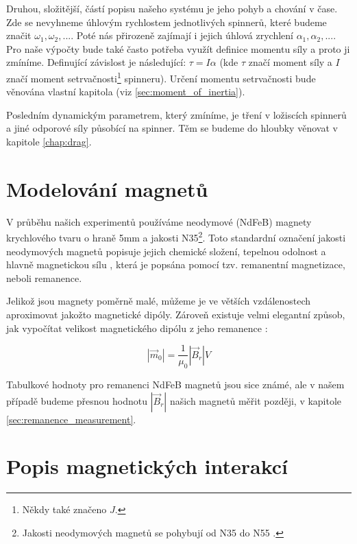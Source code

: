 Druhou, složitější, částí popisu našeho systému je jeho pohyb a chování v čase.
Zde se nevyhneme úhlovým rychlostem jednotlivých spinnerů, které budeme značit $\omega_1, \omega_2,...$.
Poté nás přirozeně zajímají i jejich úhlová zrychlení $\alpha_1, \alpha_2, ...$. Pro naše výpočty bude také často potřeba využít definice momentu síly a proto ji zmíníme. Definující závislost je následující: $\tau = I\alpha$ (kde $\tau$ značí moment síly a $I$ značí moment setrvačnosti\footnote{Někdy také značeno $J$.} spinneru).
Určení momentu setrvačnosti bude věnována vlastní kapitola (viz \autoref{sec:moment_of_inertia}).

Posledním dynamickým parametrem, který zmíníme, je tření v ložiscích spinnerů a jiné odporové síly působící na spinner.
Těm se budeme do hloubky věnovat v kapitole \ref{chap:drag}.

\clearpage

\section{Modelování magnetů}
V průběhu našich experimentů používáme neodymové (NdFeB) magnety krychlového tvaru o hraně 5mm a jakosti N35\footnote{Jakosti neodymových magnetů se pohybují od N35 do N55 \cite{magnet_grades}.}.
Toto standardní označení jakosti neodymových magnetů popisuje jejich chemické složení, tepelnou odolnost a hlavně magnetickou sílu \cite{magnet_grades}, která je popsána pomocí tzv. remanentní magnetizace, neboli remanence.

Jelikož jsou magnety poměrně malé, můžeme je ve větších vzdálenostech aproximovat jakožto magnetické dipóly.
Zároveň existuje velmi elegantní způsob, jak vypočítat velikost magnetického dipólu z jeho remanence \cite{magnetic_torque}:

\begin{equation}
    \label{eq:mag_mom_remanence}
    |\vec{m}_0| = \frac{1}{\mu_0}|\vec{B}_r|V
\end{equation}

Tabulkové hodnoty pro remanenci NdFeB magnetů jsou sice známé, ale v našem případě budeme přesnou hodnotu $|\vec{B}_r|$ našich magnetů měřit později, v kapitole \ref{sec:remanence_measurement}.

\section{Popis magnetických interakcí}

